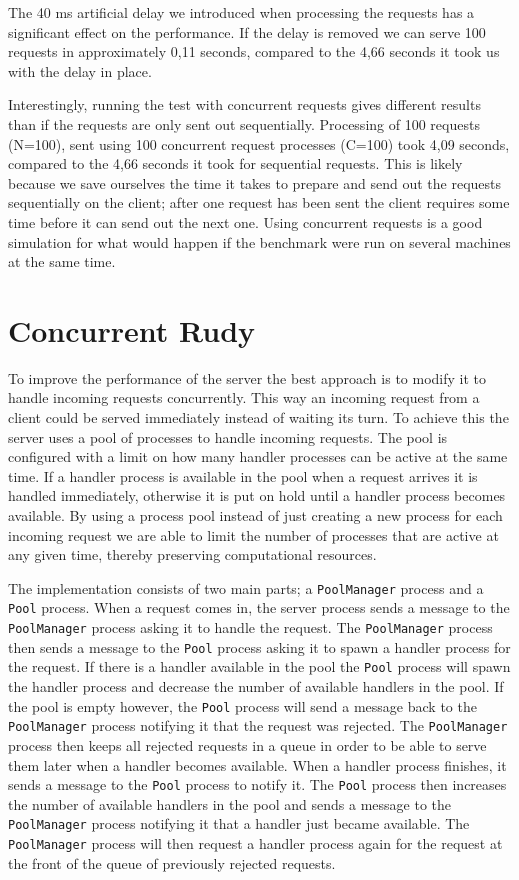 \documentclass[a4paper, 11pt]{article}
\begin{document}
The 40 ms artificial delay we introduced when processing the requests has a significant effect on the performance. If the delay is removed we can serve 100 requests in approximately 0,11 seconds, compared to the 4,66 seconds it took us with the delay in place.

Interestingly, running the test with concurrent requests gives different results than if the requests are only sent out sequentially. Processing of 100 requests (N=100), sent using 100 concurrent request processes (C=100) took 4,09 seconds, compared to the 4,66 seconds it took for sequential requests. This is likely because we save ourselves the time it takes to prepare and send out the requests sequentially on the client; after one request has been sent the client requires some time before it can send out the next one. Using concurrent requests is a good simulation for what would happen if the benchmark were run on several machines at the same time.

\section{Concurrent Rudy}

To improve the performance of the server the best approach is to modify it to handle incoming requests concurrently. This way an incoming request from a client could be served immediately instead of waiting its turn.
To achieve this the server uses a pool of processes to handle incoming requests. The pool is configured with a limit on how many handler processes can be active at the same time. If a handler process is available in the pool when a request arrives it is handled immediately, otherwise it is put on hold until a handler process becomes available. By using a process pool instead of just creating a new process for each incoming request we are able to limit the number of processes that are active at any given time, thereby preserving computational resources.

The implementation consists of two main parts; a \texttt{PoolManager} process and a \texttt{Pool} process. When a request comes in, the server process sends a message to the \texttt{PoolManager} process asking it to handle the request. The \texttt{PoolManager} process then sends a message to the \texttt{Pool} process asking it to spawn a handler process for the request. If there is a handler available in the pool the \texttt{Pool} process will spawn the handler process and decrease the number of available handlers in the pool. If the pool is empty however, the \texttt{Pool} process will send a message back to the \texttt{PoolManager} process notifying it that the request was rejected. The \texttt{PoolManager} process then keeps all rejected requests in a queue in order to be able to serve them later when a handler becomes available. When a handler process finishes, it sends a message to the \texttt{Pool} process to notify it. The \texttt{Pool} process then increases the number of available handlers in the pool and sends a message to the \texttt{PoolManager} process notifying it that a handler just became available. The \texttt{PoolManager} process will then request a handler process again for the request at the front of the queue of previously rejected requests.
\end{document}
